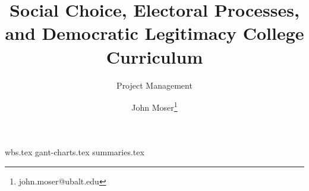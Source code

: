 \documentclass[twoside,titlepage,12pt,appendixprefix=true,usenames,dvipsnames]{scrreprt}
\begin{document}
    \author{John Moser\thanks{john.moser@ubalt.edu}}

    \title{Social Choice, Electoral Processes, and Democratic Legitimacy College Curriculum}
    \subtitle{Project Management}
    \maketitle
    \addtocounter{page}{-1}
    \tableofcontents
    \clearpage
    {wbs.tex}
    {gant-charts.tex}
    {summaries.tex}


    \printbibliography
\end{document}
